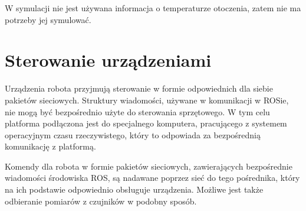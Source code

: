 	W symulacji nie jest używana informacja o temperaturze otoczenia, zatem nie ma potrzeby jej symulować.
	
\section{Sterowanie urządzeniami}
	Urządzenia robota przyjmują sterowanie w formie odpowiednich dla siebie pakietów sieciowych.
	Struktury wiadomości, używane w komunikacji w ROSie, nie mogą być bezpośrednio użyte do sterowania sprzętowego.
	W tym celu platforma podłączona jest do specjalnego komputera, pracującego z systemem operacyjnym czasu rzeczywistego, który to odpowiada za bezpośrednią komunikację
	z platformą.
	
	Komendy dla robota w formie pakietów sieciowych, zawierających bezpośrednie wiadomości środowiska ROS, są nadawane poprzez sieć do tego pośrednika, który na ich podstawie odpowiednio obsługuje urządzenia. Możliwe jest także odbieranie pomiarów z czujników w podobny sposób.
	
